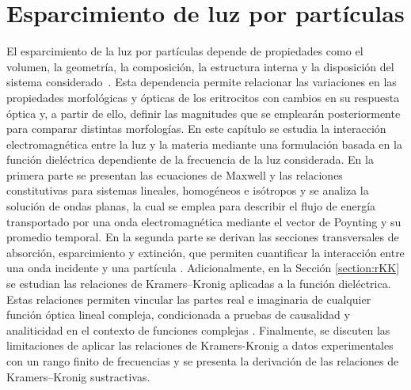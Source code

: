 
\chapter{Esparcimiento de luz por partículas}
\label{chapter:theory}

\vspace*{7em}
%
%

El esparcimiento de la luz por partículas depende de propiedades como el volumen, la geometría, la composición, la estructura interna y la disposición del sistema considerado~\cite{baldiniShiningLightFuture2025}. Esta dependencia permite relacionar las variaciones en las propiedades morfológicas y ópticas de los eritrocitos con cambios en su respuesta óptica y, a partir de ello, definir las magnitudes que se emplearán posteriormente para comparar distintas morfologías. En este capítulo se estudia la interacción electromagnética entre la luz y la materia mediante una formulación basada en la función dieléctrica dependiente de la frecuencia de la luz considerada. En la primera parte se presentan las ecuaciones de Maxwell y las relaciones constitutivas para sistemas lineales, homogéneos e isótropos y se analiza la solución de ondas planas, la cual se emplea para describir el flujo de energía transportado por una onda electromagnética mediante el vector de Poynting y su promedio temporal. En la segunda parte se derivan las secciones transversales de absorción, esparcimiento y extinción, que permiten cuantificar la interacción entre una onda incidente y una partícula \cite{bohrenAbsorptionScatteringLight2008}. Adicionalmente, en la Sección \ref{section:rKK} se estudian las relaciones de Kramers–Kronig aplicadas a la función dieléctrica. Estas relaciones permiten vincular las partes real e imaginaria de cualquier función óptica lineal compleja, condicionada a pruebas de causalidad y analiticidad en el contexto de funciones complejas \cite{lucariniKramersKronigRelationsOptical2005}. Finalmente, se discuten las limitaciones de aplicar las relaciones de Kramers-Kronig a datos experimentales con un rango finito de frecuencias y se presenta la derivación de las relaciones de Kramers–Kronig sustractivas. 



